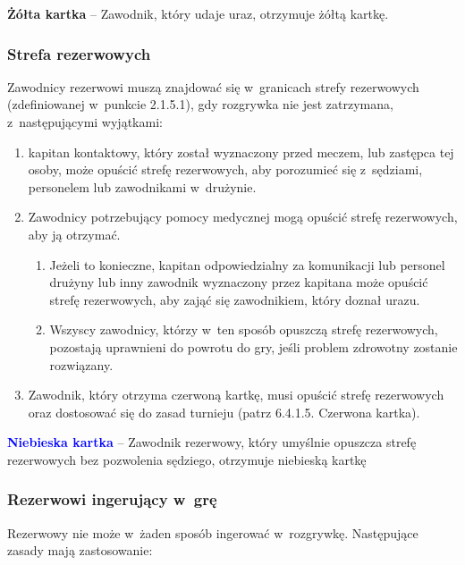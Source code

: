 \documentclass[12pt]{article}
\newcommand\yellowcard[1]{\bgroup\textcolor{darkyellow}{\textbf{#1}}}
\newcommand\bluecard[1]{\bgroup\textcolor{blue}{\textbf{#1}}}
\begin{document}
\yellowcard{Żółta kartka} -- Zawodnik, który udaje uraz, otrzymuje żółtą
kartkę.

\subsubsection{Strefa rezerwowych}

Zawodnicy rezerwowi muszą znajdować się w~granicach strefy rezerwowych
(zdefiniowanej w~punkcie 2.1.5.1), gdy rozgrywka nie jest zatrzymana, z~następującymi wyjątkami:

\begin{enumerate}
	\item
	      kapitan kontaktowy, który został wyznaczony przed meczem, lub zastępca
	      tej osoby, może opuścić strefę rezerwowych, aby porozumieć się z~sędziami, personelem lub zawodnikami w~drużynie.
	\item
	      Zawodnicy potrzebujący pomocy medycznej mogą opuścić strefę
	      rezerwowych, aby ją otrzymać.

	      \begin{enumerate}
		      \item
		            Jeżeli to konieczne, kapitan odpowiedzialny za komunikacji lub
		            personel drużyny lub inny zawodnik wyznaczony przez kapitana może
		            opuścić strefę rezerwowych, aby zająć się zawodnikiem, który doznał
		            urazu.
		      \item
		            Wszyscy zawodnicy, którzy w~ten sposób opuszczą strefę rezerwowych,
		            pozostają uprawnieni do powrotu do gry, jeśli problem zdrowotny
		            zostanie rozwiązany.
	      \end{enumerate}
	\item
	      Zawodnik, który otrzyma czerwoną kartkę, musi opuścić strefę
	      rezerwowych oraz dostosować się do zasad turnieju (patrz 6.4.1.5.
	      Czerwona kartka).
\end{enumerate}

\bluecard{Niebieska kartka} -- Zawodnik rezerwowy, który umyślnie opuszcza
strefę rezerwowych bez pozwolenia sędziego, otrzymuje niebieską kartkę

\subsubsection{Rezerwowi ingerujący w~grę}

Rezerwowy nie może w~żaden sposób ingerować w~rozgrywkę. Następujące
zasady mają zastosowanie:
\end{document}
